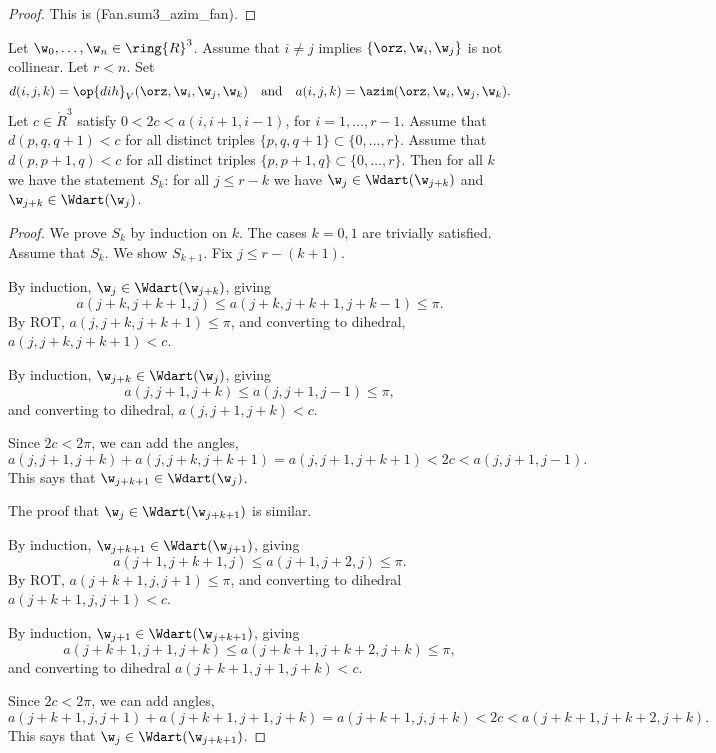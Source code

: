 \begin{proof} This is (Fan.sum3\_azim\_fan).
\end{proof}

\begin{lemma} \label{lemma:deform-wedge} 
Let $\w_0,\ldots,\w_{n}\in \ring{R}^3$.  Assume that $i\ne j$ implies
$\{\orz,\w_i,\w_j\}$ is not collinear.   Let $r<n$.
Set
\[
d(i,j,k)=\op{dih}_V(\orz,\w_i,\w_j,\w_k) \quad\text{and}\quad a(i,j,k) = \azim(\orz,\w_i,\w_j,\w_k).
\]
Let $c\in\ring{R}^3$ satisfy $0 < 2 c < a(i,i+1,i-1)$, for $i=1,\ldots,r-1$.
Assume that $d(p,q,q+1)<c$ for all distinct triples $\{p,q,q+1\}\subset \{0,\ldots,r\}$.
Assume that $d(p,p+1,q)<c$ for all distinct triples $\{p,p+1,q\}\subset \{0,\ldots,r\}$.
Then for all $k$ we have the statement $S_k$: 
for all $j\le r - k$ we have $\w_j\in \Wdart(\w_{j+k})$ and $\w_{j+k}\in \Wdart(\w_j)$.
\end{lemma}

\begin{proof} We prove $S_k$ by induction on $k$.  The cases $k=0,1$ are trivially satisfied.
Assume that $S_k$.  We show $S_{k+1}$.  Fix $j\le r-(k+1)$.

By induction, $\w_j\in \Wdart(\w_{j+k})$, giving
\[
a(j+k,j+k+1,j)\le a(j+k,j+k+1,j+k-1)\le\pi.
\]
By ROT, $a(j,j+k,j+k+1)\le\pi$, and converting to dihedral, $a(j,j+k,j+k+1)< c$.

By induction, $\w_{j+k}\in \Wdart(\w_j)$, giving
\[
a(j,j+1,j+k)\le a(j,j+1,j-1)\le \pi,
\]
and converting to dihedral, $a(j,j+1,j+k)<c$.

Since $2c < 2\pi$, we can add the angles,
\[
a(j,j+1,j+k) + a(j,j+k,j+k+1) = a(j,j+1,j+k+1) < 2c < a(j,j+1,j-1).
\]
This says that $\w_{j+k+1}\in \Wdart(\w_j)$.

The proof that $\w_j\in \Wdart(\w_{j+k+1})$ is similar.

By induction, $\w_{j+k+1}\in \Wdart(\w_{j+1})$, giving
\[
a(j+1,j+k+1,j)\le a(j+1,j+2,j)\le \pi.
\]
By ROT, $a(j+k+1,j,j+1)\le \pi$, and converting to dihedral $a(j+k+1,j,j+1)<c$.

By induction, $\w_{j+1}\in \Wdart(\w_{j+k+1})$, giving
\[
a(j+k+1,j+1,j+k)\le a (j+k+1,j+k+2,j+k)\le \pi,
\]
and converting to dihedral $a(j+k+1,j+1,j+k) < c$.

Since $2c < 2\pi$, we can add angles,
\[
a(j+k+1,j,j+1) + a(j+k+1,j+1,j+k) = a(j+k+1,j,j+k) < 2 c < a(j+k+1,j+k+2,j+k).
\]
This says that $\w_{j}\in \Wdart(\w_{j+k+1})$.
\end{proof}

